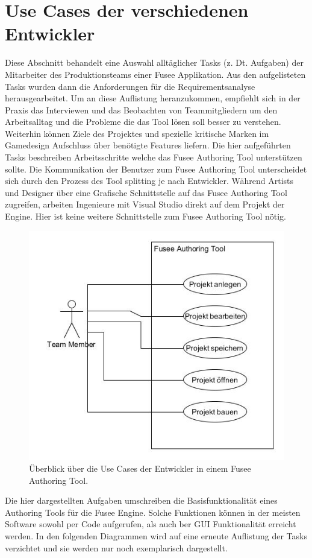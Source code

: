\documentclass[pagesize, paper=a4, fontsize=12pt, titlepage=true, headings=small, headnosepline, abstractoff, liststotoc, nochapterprefix, plainheadsepline, twoside]{scrreprt}
\begin{document}
\section{Use Cases der verschiedenen Entwickler}
Diese Abschnitt behandelt eine Auswahl alltäglicher Tasks (z. Dt. Aufgaben) der Mitarbeiter des Produktionsteams einer Fusee Applikation. Aus den aufgelisteten Tasks wurden dann die Anforderungen für die Requirementsanalyse herausgearbeitet. Um an diese Auflistung heranzukommen, empfiehlt sich in der Praxis das Interviewen und das Beobachten von Teammitgliedern um den Arbeitsalltag und die Probleme die das Tool lösen soll besser zu verstehen. Weiterhin können Ziele des Projektes und spezielle kritische Marken im Gamedesign Aufschluss über benötigte Features liefern.
Die hier aufgeführten Tasks beschreiben Arbeitsschritte welche das Fusee Authoring Tool unterstützen sollte. Die Kommunikation der Benutzer zum Fusee Authoring Tool unterscheidet sich durch den Prozess des Tool splitting je nach Entwickler. Während Artists und Designer über eine Grafische Schnittstelle auf das Fusee Authoring Tool zugreifen, arbeiten Ingenieure mit Visual Studio direkt auf dem Projekt der Engine. Hier ist keine weitere Schnittstelle zum Fusee Authoring Tool nötig.

\begin{figure}[ht]
	\centering
	\includegraphics[width=\linewidth]{Bilder/UseCase_Allgemein.jpg}
	\caption{Überblick über die Use Cases der Entwickler in einem Fusee Authoring Tool.}
	\label{UseCaseAllgemein}
\end{figure}
Die hier dargestellten Aufgaben umschreiben die Basisfunktionalität eines Authoring Tools für die Fusee Engine. Solche Funktionen können in der meisten Software sowohl per Code aufgerufen, als auch ber GUI Funktionalität erreicht werden. In den folgenden Diagrammen wird auf eine erneute Auflistung der Tasks verzichtet und sie werden nur noch exemplarisch dargestellt.
\end{document}

